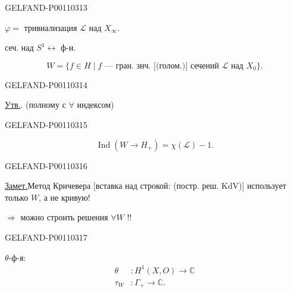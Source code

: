 \begin{GelfandAdjacentEvidence}{GELFAND-P001103}{13}


$\varphi=$ тривиализация $\mathcal L$ над $X_\infty$.

сеч. над $S^1\leftrightarrow$ ф-и.

\[
W=\{f\in H\mid f\text{ — гран. знч. [(голом.)] сечений }
\mathcal L\text{ над }X_0\}.
\]
\end{GelfandAdjacentEvidence}
\begin{GelfandAdjacentEvidence}{GELFAND-P001103}{14}


\underline{Утв.}\quad {}. (полному с $\forall$ индексом)
\end{GelfandAdjacentEvidence}
\begin{GelfandAdjacentEvidence}{GELFAND-P001103}{15}

\[
\operatorname{Ind}(W\longrightarrow H_+)=\chi(\mathcal L)-1.
\]
\end{GelfandAdjacentEvidence}
\begin{GelfandAdjacentEvidence}{GELFAND-P001103}{16}


\underline{Замет.}\quad Метод Кричевера [вставка над строкой: (постр. реш. KdV)]
использует только $W$, а не кривую!

$\Rightarrow$ можно строить решения $\forall W$ !!
\end{GelfandAdjacentEvidence}
\begin{GelfandAdjacentEvidence}{GELFAND-P001103}{17}


$\theta$-ф-я:
\[
\begin{aligned}
\theta&:H^1(X,O)\longrightarrow\mathbb C\\
\tau_W&:\Gamma_+\longrightarrow\mathbb C.
\end{aligned}
\]
\end{GelfandAdjacentEvidence}



